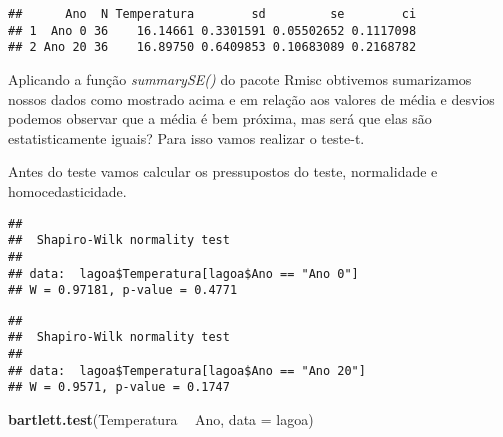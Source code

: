 \documentclass[]{book}
\newenvironment{Shaded}{\begin{snugshade}}{\end{snugshade}}
\newcommand{\DataTypeTok}[1]{\textcolor[rgb]{0.13,0.29,0.53}{#1}}
\newcommand{\KeywordTok}[1]{\textcolor[rgb]{0.13,0.29,0.53}{\textbf{#1}}}
\newcommand{\NormalTok}[1]{#1}
\newcommand{\OperatorTok}[1]{\textcolor[rgb]{0.81,0.36,0.00}{\textbf{#1}}}
\newcommand{\StringTok}[1]{\textcolor[rgb]{0.31,0.60,0.02}{#1}}
\begin{document}
\begin{verbatim}
##      Ano  N Temperatura        sd         se        ci
## 1  Ano 0 36    16.14661 0.3301591 0.05502652 0.1117098
## 2 Ano 20 36    16.89750 0.6409853 0.10683089 0.2168782
\end{verbatim}

Aplicando a função \emph{summarySE()} do pacote Rmisc obtivemos sumarizamos nossos dados como mostrado acima e em relação aos valores de média e desvios podemos observar que a média é bem próxima, mas será que elas são estatisticamente iguais? Para isso vamos realizar o teste-t.

Antes do teste vamos calcular os pressupostos do teste, normalidade e homocedasticidade.

\begin{Shaded}
\end{Shaded}

\begin{verbatim}
## 
##  Shapiro-Wilk normality test
## 
## data:  lagoa$Temperatura[lagoa$Ano == "Ano 0"]
## W = 0.97181, p-value = 0.4771
\end{verbatim}

\begin{Shaded}
\end{Shaded}

\begin{verbatim}
## 
##  Shapiro-Wilk normality test
## 
## data:  lagoa$Temperatura[lagoa$Ano == "Ano 20"]
## W = 0.9571, p-value = 0.1747
\end{verbatim}

\begin{Shaded}
\begin{Highlighting}[]
\KeywordTok{bartlett.test}\NormalTok{(Temperatura }\OperatorTok{~}\StringTok{ }\NormalTok{Ano, }\DataTypeTok{data =}\NormalTok{ lagoa)}
\end{Highlighting}
\end{Shaded}
\end{document}
